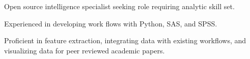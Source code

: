 \documentclass[letter,10pt]{article}
\begin{document}
\begin{zitemize}
\item{Open source intelligence specialist seeking role requiring analytic skill set.} 
\item{Experienced in developing work flows with Python, SAS, and SPSS.}
\item{Proficient in feature extraction, integrating data with existing workflows, and visualizing data for peer reviewed academic papers.}
\end{zitemize}
\end{document}
